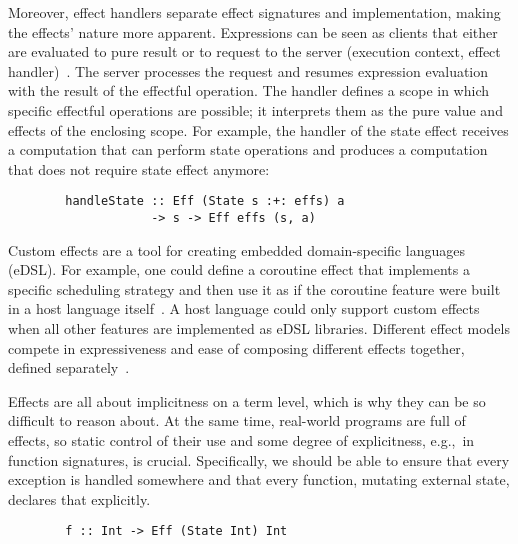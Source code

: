 \documentclass[conference]{IEEEtran}
\begin{document}
    Moreover, effect handlers separate effect signatures and implementation, making the effects' nature more apparent.
    Expressions can be seen as clients that either are evaluated to pure result or to request to the server (execution context, effect handler)~\cite{kiselyov2013extensible}.
    The server processes the request and resumes expression evaluation with the result of the effectful operation.
    The handler defines a scope in which specific effectful operations are possible; it interprets them as the pure value and effects of the enclosing scope.
    For example, the handler of the state effect receives a computation that can perform state operations and produces a computation that does not require state effect anymore:
    \begin{verbatim}
        handleState :: Eff (State s :+: effs) a
                    -> s -> Eff effs (s, a)
    \end{verbatim}

    Custom effects are a tool for creating embedded domain-specific languages (eDSL).
    For example, one could define a coroutine effect that implements a specific scheduling strategy and then use it as if the coroutine feature were built in a host language itself~\cite{leijen2017structured}.
    A host language could only support custom effects when all other features are implemented as eDSL libraries.
    Different effect models compete in expressiveness and ease of composing different effects together, defined separately~\cite{liang1995monad, kiselyov2013extensible, schrijvers2019monad, van2024framework}.

    Effects are all about implicitness on a term level, which is why they can be so difficult to reason about.
    At the same time, real-world programs are full of effects, so static control of their use and some degree of explicitness, e.g.,\ in function signatures, is crucial.
    Specifically, we should be able to ensure that every exception is handled somewhere and that every function, mutating external state, declares that explicitly.
    \begin{verbatim}
        f :: Int -> Eff (State Int) Int
    \end{verbatim}
\end{document}
